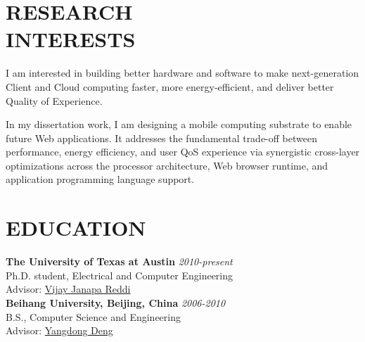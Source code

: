 \documentclass[margin, 9pt]{res} %
\begin{document}
\begin{resume}


\vspace*{-5pt}
\section{RESEARCH\\ INTERESTS} 

I am interested in building better hardware and software to make next-generation
Client and Cloud computing faster, more energy-efficient, and deliver better
Quality of Experience.

In my dissertation work, I am designing a mobile computing substrate to enable future Web applications. It addresses the fundamental trade-off between performance, energy efficiency, and user QoS experience via synergistic cross-layer optimizations across the processor architecture, Web browser runtime, and application programming language support.
 


\section{EDUCATION}

\textbf{The University of Texas at Austin} \hfill\textit{2010-present}\\
Ph.D. student, Electrical and Computer Engineering\\
Advisor: \href{http://3nity.io/~vj/}{Vijay Janapa Reddi}\\

\vspace*{-5pt}
\textbf{Beihang University, Beijing, China} \hfill\textit{2006-2010}\\
B.S., Computer Science and Engineering\\
Advisor: \href{https://research.nvidia.com/content/yangdong-steve-deng}{Yangdong Deng}


\end{resume}
\end{document}
